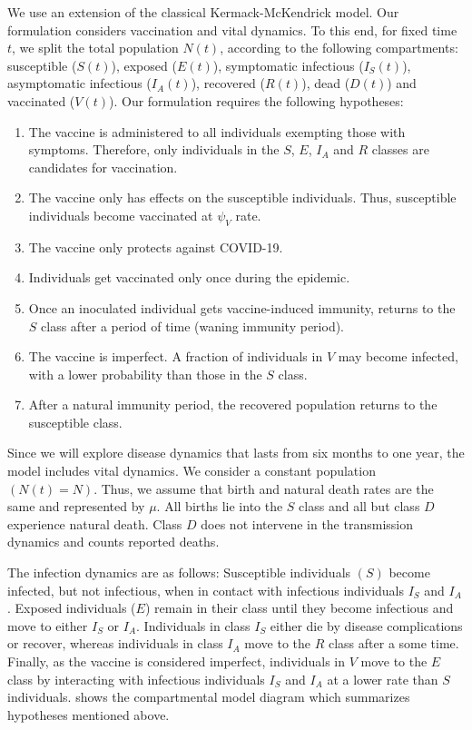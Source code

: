 We use an extension of the classical Kermack-McKendrick model.
Our formulation considers vaccination and vital dynamics. To this end, for fixed time $t$, we 
split the total population $N(t)$, according to the following compartments: 
susceptible ($S(t)$), 
exposed ($E(t)$),
symptomatic infectious ($I_S(t)$),
asymptomatic infectious ($I_A(t)$),
recovered ($R(t)$), 
dead ($D(t)$) and vaccinated ($V(t)$).
Our formulation requires the following hypotheses: 
\begin{enumerate}[(\textbf{H}-1)]
    \item
        The vaccine is administered to all individuals
        exempting those with symptoms. Therefore, only individuals in the $S$, $E$, $I_A$ and $R$ 
        classes are candidates for vaccination. 
    \item    
        The vaccine only has effects on the susceptible individuals. Thus, 
        susceptible individuals become vaccinated at $\psi_V$ rate.
    \item 
        The vaccine only protects against COVID-19.
    \item
        Individuals get vaccinated only once during the epidemic. 
    \item Once an inoculated individual gets vaccine-induced immunity, returns to the
    $S$ class after a period of time (waning immunity period).
    \item 
        The vaccine is imperfect. A fraction
        of individuals in $V$ may become infected, with a lower 
        probability than those in the $S$ class. 
    \item After a natural immunity period, the recovered population returns to the 
    susceptible class. 
\end{enumerate}

    Since we will explore disease dynamics that lasts from six months to one year, 
the model includes vital dynamics. We consider a constant population $(N(t)= N)$. Thus, we assume that birth and 
natural death rates are the same
and represented by $ \mu $. All births lie into the $S$ class and all but class $D$ experience 
natural death. Class $D$ does not intervene in the transmission
dynamics and counts reported deaths. 

    The infection dynamics are as follows: Susceptible individuals $(S)$ become 
infected, but not infectious, when in contact with infectious
individuals $I_S$ and $I_A$. Exposed individuals ($E$) remain in their class until they become
infectious and move to either $I_S$ or $I_A$. Individuals in class $I_S$ either die by disease
complications or recover, whereas individuals in class $I_A$ move to the $R$ class after a some time. Finally, as the vaccine is considered imperfect, individuals in $V$ move to the $E$ class
by interacting with infectious individuals $I_S$ and $I_A$ at a lower rate than $S$ individuals. 
 shows the compartmental model diagram which summarizes hypotheses mentioned above.

